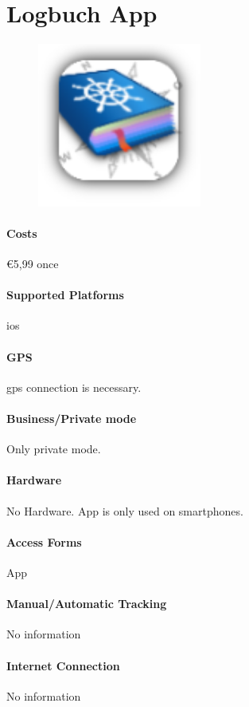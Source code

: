 \section{Logbuch App}
\begin{figure}
  \begin{center}
    \includegraphics[width=0.48\textwidth]{bilder/logbuchapp}
  \end{center}
\end{figure}
\paragraph{Costs} \euro 5,99 once
\paragraph{Supported Platforms} \gls{ios}
\paragraph{GPS} \gls{gps} connection is necessary.
\paragraph{Business/Private mode} Only private mode.
\paragraph{Hardware} No Hardware. App is only used on smartphones.
\paragraph{Access Forms} App
\paragraph{Manual/Automatic Tracking} No information
\paragraph{Internet Connection} No information
